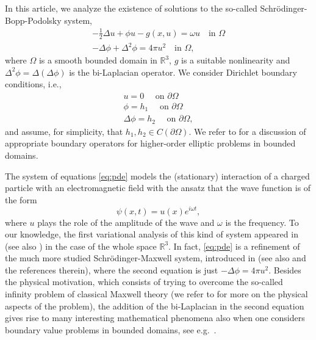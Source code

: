 \documentclass[10pt,a4paper]{amsart}
\numberwithin{equation}{section}
\begin{document}
In this article, we analyze the existence of solutions to the so-called Schr\"odinger-Bopp-Podolsky system,
\begin{equation} \label{eq:pde}
  \begin{gathered}
 - \frac{1}{2} \Delta u + \phi u - g(x, u)  =  \omega u  \quad \text{in } \Omega \\
 - \Delta \phi + \Delta^2 \phi  =  4 \pi u^2  \quad \text{in } \Omega,
 \end{gathered}
\end{equation}
where $\Omega$ is a smooth bounded domain in $\mathbb R^3$, $g$ is a suitable 
nonlinearity and $\Delta^2 \phi = \Delta (\Delta \phi)$ is the bi-Laplacian operator. 
We consider Dirichlet boundary conditions, i.e.,
\begin{equation}
 \label{eq:Dirichlet_BC}
\begin{gathered}
 u  =  0  \quad \text{ on } \partial\Omega \\
 \phi  =  h_1  \quad \text{ on } \partial\Omega \\
 \Delta \phi  =  h_2  \quad \text{ on } \partial\Omega,
 \end{gathered}
\end{equation}
and assume, for simplicity, that $h_1, h_2 \in C(\partial\Omega)$.
We refer to \cite{GazzolaGrunauSweers2010} for a discussion of appropriate boundary 
operators for higher-order elliptic problems in bounded domains.

The system of equations \eqref{eq:pde} models the (stationary) interaction of a
charged particle with an electromagnetic field with the ansatz that the wave function 
is of the form
\[
 \psi(x, t) = u(x) e^{i \omega t},
\]
where $u$ plays the role of the amplitude of the wave and $\omega$ is the frequency. 
To our knowledge, the first variational analysis of this kind of system appeared in 
\cite{dAveniaSiciliano2019} (see also 
\cite{QuoirinSicilianoSilva2024, MascaroSiciliano2022}) in the case of the whole space 
$\mathbb R^3$. In fact, \eqref{eq:pde} is a refinement of the much more studied 
Schr\"odinger-Maxwell system, introduced in \cite{BenciFortunato1998} 
(see also \cite{PisaniSiciliano2007b,PisaniSiciliano2007,PisaniSiciliano2013} and the 
references therein), where the second equation is just $- \Delta \phi = 4\pi u^2$.
 Besides the physical motivation, which consists of trying to overcome the so-called 
 infinity problem of classical Maxwell theory (we refer to \cite{dAveniaSiciliano2019} 
for more on the physical aspects of the problem), the addition of the bi-Laplacian 
in the second equation gives rise to many interesting mathematical phenomena also when 
one considers boundary value problems in bounded domains, see e.g.\
\cite{AfonsoSiciliano2021}.
\end{document}
